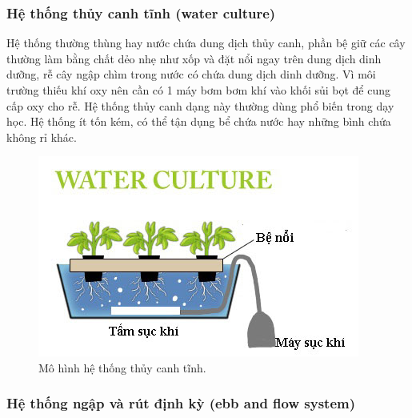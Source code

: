 \documentclass[a4paper,12pt,oneside]{article}
\begin{document}
\subsubsection{Hệ thống thủy canh tĩnh (water culture)}
\noindent Hệ thống thường thùng hay nước chứa dung dịch thủy canh, phần bệ giữ các cây thường làm bằng chất dẻo nhẹ như xốp và đặt nổi ngay trên dung dịch dinh dưỡng, rễ cây ngập chìm trong nước có chứa dung dịch dinh dưỡng. Vì môi trường thiếu khí oxy nên cần có 1 máy bơm bơm khí vào khối sủi bọt để cung cấp oxy cho rễ. Hệ thống thủy canh dạng này thường dùng phổ biến trong dạy học. Hệ thống ít tốn kém, có thể tận dụng bể chứa nước hay những bình chứa không rỉ khác.\\


\begin{center}
\begin{figure}[htp]
\begin{center}
\includegraphics[scale=.8]{hinh/Water_culture.jpg}
\end{center}
\caption{Mô hình hệ thống thủy canh tĩnh.}

\end{figure}
\end{center}


\subsubsection{Hệ thống ngập và rút định kỳ (ebb and flow system)}
\end{document}
